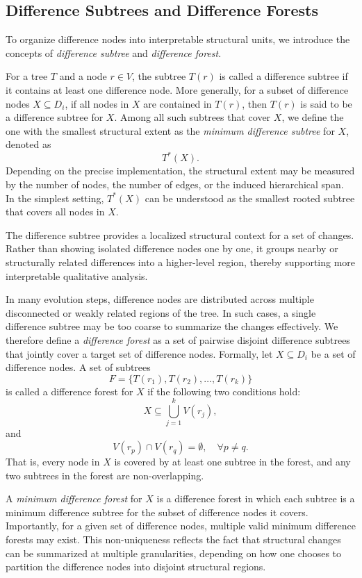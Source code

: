 \subsection{Difference Subtrees and Difference Forests}

To organize difference nodes into interpretable structural units, we introduce the concepts of \emph{difference subtree} and \emph{difference forest}.

For a tree $T$ and a node $r \in V$, the subtree $T(r)$ is called a difference subtree if it contains at least one difference node. More generally, for a subset of difference nodes $X \subseteq D_i$, if all nodes in $X$ are contained in $T(r)$, then $T(r)$ is said to be a difference subtree for $X$. Among all such subtrees that cover $X$, we define the one with the smallest structural extent as the \emph{minimum difference subtree} for $X$, denoted as
\[
T^*(X).
\]
Depending on the precise implementation, the structural extent may be measured by the number of nodes, the number of edges, or the induced hierarchical span. In the simplest setting, $T^*(X)$ can be understood as the smallest rooted subtree that covers all nodes in $X$.

The difference subtree provides a localized structural context for a set of changes. Rather than showing isolated difference nodes one by one, it groups nearby or structurally related differences into a higher-level region, thereby supporting more interpretable qualitative analysis.

In many evolution steps, difference nodes are distributed across multiple disconnected or weakly related regions of the tree. In such cases, a single difference subtree may be too coarse to summarize the changes effectively. We therefore define a \emph{difference forest} as a set of pairwise disjoint difference subtrees that jointly cover a target set of difference nodes. Formally, let $X \subseteq D_i$ be a set of difference nodes. A set of subtrees
\[
F = \{T(r_1), T(r_2), \dots, T(r_k)\}
\]
is called a difference forest for $X$ if the following two conditions hold:
\[
X \subseteq \bigcup_{j=1}^{k} V(r_j),
\]
and
\[
V(r_p) \cap V(r_q) = \emptyset, \quad \forall p \neq q.
\]
That is, every node in $X$ is covered by at least one subtree in the forest, and any two subtrees in the forest are non-overlapping.

A \emph{minimum difference forest} for $X$ is a difference forest in which each subtree is a minimum difference subtree for the subset of difference nodes it covers. Importantly, for a given set of difference nodes, multiple valid minimum difference forests may exist. This non-uniqueness reflects the fact that structural changes can be summarized at multiple granularities, depending on how one chooses to partition the difference nodes into disjoint structural regions.

